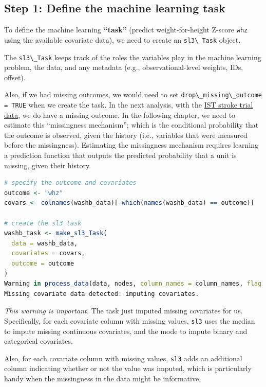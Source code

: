 \documentclass[12pt, krantz2,]{krantz}
\newcommand{\passthrough}[1]{#1}
\theoremstyle{definition}
\theoremstyle{definition}
\theoremstyle{definition}
\newcommand{\1}{\mathbbm{1}}
\begin{document}
\hypertarget{step-1-define-the-machine-learning-task}{%
\subsection{Step 1: Define the machine learning task}\label{step-1-define-the-machine-learning-task}}

To define the machine learning \textbf{``task''} (predict weight-for-height Z-score
\passthrough{\lstinline!whz!} using the available covariate data), we need to create an \passthrough{\lstinline!sl3\_Task!}
object.

The \passthrough{\lstinline!sl3\_Task!} keeps track of the roles the variables play in the machine
learning problem, the data, and any metadata (e.g., observational-level
weights, IDs, offset).

Also, if we had missing outcomes, we would need to set \passthrough{\lstinline!drop\_missing\_outcome = TRUE!} when we create the task. In the next analysis, with the \protect\hyperlink{ist}{IST stroke trial
data}, we do have a missing outcome. In the following chapter, we need to
estimate this ``missingness mechanism''; which is the conditional probability that
the outcome is observed, given the history (i.e., variables that were measured
before the missingness). Estimating the missingness mechanism requires learning
a prediction function that outputs the predicted probability that a unit is
missing, given their history.

\begin{lstlisting}[language=R]
# specify the outcome and covariates
outcome <- "whz"
covars <- colnames(washb_data)[-which(names(washb_data) == outcome)]

# create the sl3 task
washb_task <- make_sl3_Task(
  data = washb_data,
  covariates = covars,
  outcome = outcome
)
Warning in process_data(data, nodes, column_names = column_names, flag = flag, :
Missing covariate data detected: imputing covariates.
\end{lstlisting}

\emph{This warning is important.} The task just imputed missing covariates for us.
Specifically, for each covariate column with missing values, \passthrough{\lstinline!sl3!} uses the
median to impute missing continuous covariates, and the mode to impute binary
and categorical covariates.

Also, for each covariate column with missing values, \passthrough{\lstinline!sl3!} adds an additional
column indicating whether or not the value was imputed, which is particularly
handy when the missingness in the data might be informative.
\end{document}
